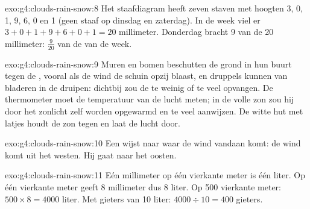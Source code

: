 \begin{solution}{exo:g4:clouds-rain-snow:8}
Het staafdiagram heeft zeven staven met hoogten 3, 0, 1, 9, 6, 0 en 1 (geen
staaf op dinsdag en zaterdag). In de week viel er
$3 + 0 + 1 + 9 + 6 + 0 + 1 = 20$ millimeter. Donderdag bracht 9 van de
20 millimeter: $\frac{9}{20}$ van de  van de week.
\end{solution}

\begin{solution}{exo:g4:clouds-rain-snow:9}
Muren en bomen beschutten de grond in hun buurt tegen de , vooral als
de wind de  schuin opzij blaast, en druppels kunnen van bladeren in de
 druipen: dichtbij zou de  te weinig of te veel
opvangen. De thermometer moet de temperatuur van de lucht meten; in de
volle zon zou hij door het zonlicht zelf worden opgewarmd en te veel
aanwijzen. De witte hut met latjes houdt de zon tegen en laat de lucht door.
\end{solution}

\begin{solution}{exo:g4:clouds-rain-snow:10}
Een  wijst naar waar de wind vandaan komt: de wind komt uit het
westen. Hij gaat naar het oosten.
\end{solution}

\begin{solution}{exo:g4:clouds-rain-snow:11}
Eén millimeter  op één vierkante meter is één liter. Op één vierkante
meter geeft 8 millimeter dus 8 liter. Op 500 vierkante meter:
$500 \times 8 = 4000$ liter. Met gieters van 10 liter:
$4000 \div 10 = 400$ gieters.
\end{solution}
